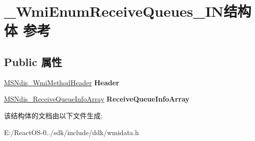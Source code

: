 \hypertarget{struct___wmi_enum_receive_queues___i_n}{}\section{\+\_\+\+Wmi\+Enum\+Receive\+Queues\+\_\+\+I\+N结构体 参考}
\label{struct___wmi_enum_receive_queues___i_n}
\subsection*{Public 属性}
\begin{DoxyCompactItemize}
\item 
\mbox{\label{struct___wmi_enum_receive_queues___i_n_a734b9c8676dd407da8c31d26bdbec0e3}} 
\hyperlink{struct___m_s_ndis___wmi_method_header}{M\+S\+Ndis\+\_\+\+Wmi\+Method\+Header} {\bfseries Header}
\item 
\mbox{\label{struct___wmi_enum_receive_queues___i_n_aba87f67407c3954579850a2d65b85297}} 
\hyperlink{struct___m_s_ndis___receive_queue_info_array}{M\+S\+Ndis\+\_\+\+Receive\+Queue\+Info\+Array} {\bfseries Receive\+Queue\+Info\+Array}
\end{DoxyCompactItemize}


该结构体的文档由以下文件生成\+:\begin{DoxyCompactItemize}
\item 
E\+:/\+React\+O\+S-\/0../sdk/include/ddk/wmidata.\+h\end{DoxyCompactItemize}
